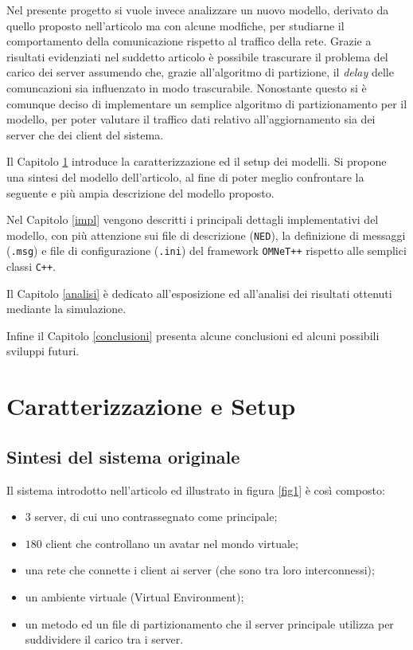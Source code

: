 \documentclass[a4paper, 11pt, oneside]{book}
\theoremstyle{definition}
\theoremstyle{remark}
\begin{document}
Nel presente progetto si vuole invece analizzare un nuovo modello, derivato
da quello proposto nell'articolo ma con alcune modfiche, per studiarne il
comportamento della comunicazione rispetto al traffico della rete.
Grazie a risultati evidenziati nel suddetto articolo è possibile trascurare
il problema del carico dei server assumendo che, grazie all'algoritmo di
partizione, il \emph{delay} delle comuncazioni sia influenzato in modo
trascurabile. Nonostante questo si è comunque deciso di implementare un
semplice algoritmo di partizionamento per il modello, per poter valutare
il traffico dati relativo all'aggiornamento sia dei server che dei client
del sistema.

Il Capitolo \ref{setup} introduce la caratterizzazione ed il setup dei
modelli. Si propone una sintesi del modello dell'articolo, al fine di poter
meglio confrontare la seguente e più ampia descrizione del modello proposto.

Nel Capitolo \ref{impl} vengono descritti i principali dettagli implementativi
del modello, con più attenzione sui file di descrizione (\texttt{NED}),
la definizione di messaggi (\texttt{.msg}) e file di configurazione
(\texttt{.ini}) del framework \texttt{OMNeT++} rispetto alle semplici classi
\texttt{C++}.

Il Capitolo \ref{analisi} è dedicato all'esposizione ed all'analisi dei
risultati ottenuti mediante la simulazione.

Infine il Capitolo \ref{conclusioni} presenta alcune conclusioni ed alcuni
possibili sviluppi futuri.


\chapter{Caratterizzazione e Setup}\label{setup}
\section{Sintesi del sistema originale}\label{modello_orig}
Il sistema introdotto nell'articolo ed illustrato in figura \ref{fig1}
è così composto:
\begin{itemize}
\item
$3$ server, di cui uno contrassegnato come principale;
\item
$180$ client che controllano un avatar nel mondo virtuale;
\item
una rete che connette i client ai server (che sono tra loro interconnessi);
\item
un ambiente virtuale (Virtual Environment);
\item
un metodo ed un file di partizionamento che il server principale utilizza per
suddividere il carico tra i server.
\end{itemize}
\end{document}
